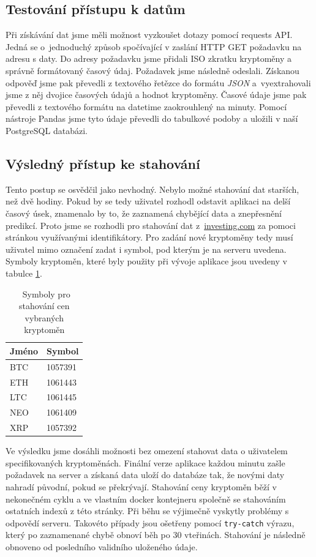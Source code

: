 \subsection{Testování přístupu k datům}

Při získávání dat jsme měli možnost vyzkoušet dotazy pomocí requests API. 
Jedná se o~jednoduchý způsob spočívající v zaslání HTTP GET požadavku na adresu s daty. 
Do adresy požadavku jsme přidali ISO zkratku kryptoměny a správně formátovaný časový údaj. 
Požadavek jsme následně odeslali. 
Získanou odpověď jsme pak převedli z textového řetězce do formátu \textit{JSON} a~vyextrahovali jsme z něj dvojice časových údajů a hodnot kryptoměny. 
Časové údaje jsme pak převedli z textového formátu na datetime zaokrouhlený na minuty. 
Pomocí nástroje Pandas jsme tyto údaje převedli do tabulkové podoby a uložili v naší PostgreSQL databázi.

\subsection{Výsledný přístup ke stahování}

Tento postup se osvědčil jako nevhodný.
Nebylo možné stahování dat starších, než dvě hodiny.
Pokud by se tedy uživatel rozhodl odstavit aplikaci na delší časový úsek, znamenalo by to, že zaznamená chybějící data a znepřesnění predikcí.
Proto jsme se rozhodli pro stahování dat z~\url{investing.com} za pomoci stránkou využívanými identifikátory.
Pro zadání nové kryptoměny tedy musí uživatel mimo označení zadat i symbol, pod kterým je na serveru uvedena.
Symboly kryptoměn, které byly použity při vývoje aplikace jsou uvedeny v tabulce \ref{symbols}.

\begin{table}\centering
\caption{~Symboly pro stahování cen vybraných kryptoměn}\label{symbols}
\begin{tabular}{l|l}
    Jméno & Symbol	\tabularnewline \hline 
    BTC	            & 1057391 \tabularnewline \hline
    ETH	            & 1061443 \tabularnewline \hline
    LTC             & 1061445 \tabularnewline \hline
    NEO             & 1061409 \tabularnewline \hline
    XRP             & 1057392 \tabularnewline
\end{tabular}
\end{table}

Ve výsledku jsme dosáhli možnosti bez omezení stahovat data o uživatelem specifikovaných kryptoměnách. 
Finální verze aplikace každou minutu zašle požadavek na server a získaná data uloží do databáze tak, že novými daty nahradí původní, pokud se překrývají. 
Stahování ceny kryptoměn běží v nekonečném cyklu a ve vlastním docker kontejneru společně se stahováním ostatních indexů z této stránky.
Při běhu se výjimečně vyskytly problémy s odpovědí serveru. 
Takovéto případy jsou ošetřeny pomocí \verb|try-catch| výrazu, který po zaznamenané chybě obnoví běh po 30 vteřinách.
Stahování je následně obnoveno od posledního validního uloženého údaje.

